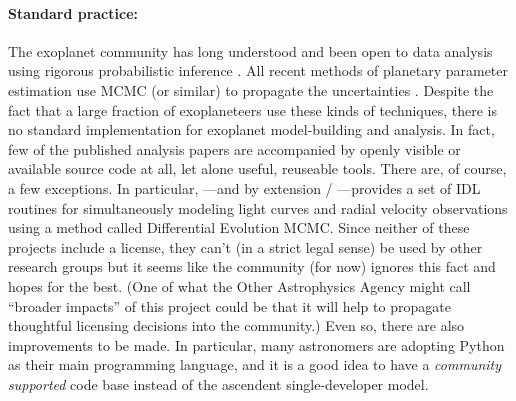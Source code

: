 \documentclass[letterpaper,12pt,preprint]{hack_aastex}
\begin{document}
\paragraph{Standard practice:}
The exoplanet community has long understood and been open to data analysis
using rigorous probabilistic inference \citep[for example,][]{gregory,ford}.
All recent methods of planetary parameter estimation use MCMC (or similar) to
propagate the uncertainties \citep[][to name only a few]{barclay,dressing,%
kepler5,kepler4}.
Despite the fact that a large fraction of exoplaneteers use these kinds of techniques, there is no standard
implementation for exoplanet model-building and analysis.
In fact, few of the published analysis papers are accompanied by openly visible or available source code at all, let alone useful, reuseable tools.
There are, of course, a few exceptions.
In particular,  \citep{exofast}---and by extension
/ \citep{autokep}---provides a set of IDL
routines for simultaneously modeling light curves and radial velocity
observations using a method called Differential Evolution MCMC.\@
Since neither of these projects include a license, they can't (in a strict legal sense) be used
by other research groups but it seems like the community (for now) ignores this fact and
hopes for the best.
(One of what the Other Astrophysics Agency might call ``broader impacts'' of this project could be that it will help to propagate thoughtful licensing decisions into the community.)
Even so, there are also improvements to be made.
In particular, many astronomers are adopting Python as their main programming
language, and it is a good idea to have a \emph{community supported} code
base instead of the ascendent single-developer model.
\end{document}
